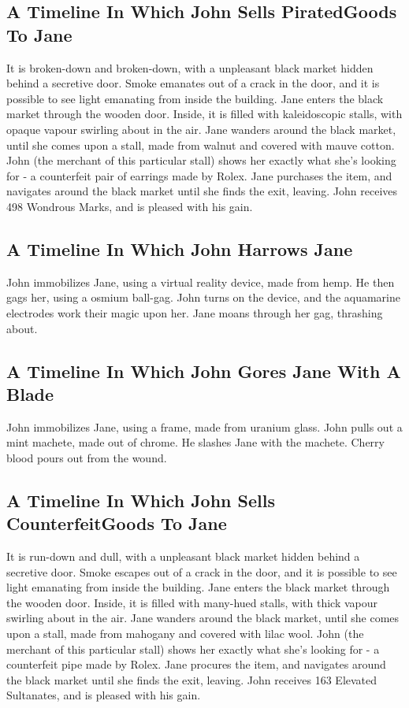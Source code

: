 \documentclass{article}
\begin{document}
\subsection{A Timeline In Which John Sells PiratedGoods To Jane}


It is broken{-}down and broken{-}down, with a unpleasant black market hidden behind a secretive door.
Smoke emanates out of a crack in the door, and it is possible to see light emanating from inside the building.
Jane enters the black market through the wooden door.
Inside, it is filled with kaleidoscopic stalls, with opaque vapour swirling about in the air.
Jane wanders around the black market, until she comes upon a stall, made from walnut and covered with mauve cotton.
John (the merchant of this particular stall) shows her exactly what she's looking for {-} a counterfeit pair of earrings made by Rolex.
Jane purchases the item, and navigates around the black market until she finds the exit, leaving.
John receives 498 Wondrous Marks, and is pleased with his gain.
\subsection{A Timeline In Which John Harrows Jane}


John immobilizes Jane, using a virtual reality device, made from hemp.
He then gags her, using a osmium ball{-}gag.
John turns on the device, and the aquamarine electrodes work their magic upon her.
Jane moans through her gag, thrashing about.
\subsection{A Timeline In Which John Gores Jane With A Blade}


John immobilizes Jane, using a frame, made from uranium glass.
John pulls out a mint machete, made out of chrome.
He slashes Jane with the machete.
Cherry blood pours out from the wound.
\subsection{A Timeline In Which John Sells CounterfeitGoods To Jane}


It is run{-}down and dull, with a unpleasant black market hidden behind a secretive door.
Smoke escapes out of a crack in the door, and it is possible to see light emanating from inside the building.
Jane enters the black market through the wooden door.
Inside, it is filled with many{-}hued stalls, with thick vapour swirling about in the air.
Jane wanders around the black market, until she comes upon a stall, made from mahogany and covered with lilac wool.
John (the merchant of this particular stall) shows her exactly what she's looking for {-} a counterfeit pipe made by Rolex.
Jane procures the item, and navigates around the black market until she finds the exit, leaving.
John receives 163 Elevated Sultanates, and is pleased with his gain.
\end{document}
